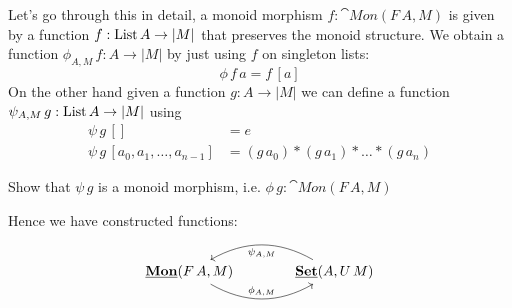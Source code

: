 Let's go through this in detail, a monoid morphism $f:\cat{Mon}(F\,A,M)$ is given by a function $f:\mathrm{List}\,A \to |M|$ that preserves the monoid structure. We obtain a function $\phi_{A,M}\,f : A \to |M|$ by just using $f$ on singleton lists: 
\[\phi\,f\,a = f\,[a]\] 
On the other hand given a function $g : A \to |M|$ we can define a function $\psi_{A,M}\,g : \mathrm{List}\,A \to |M|$ using
\begin{align*}
  \psi\,g\,[] & = e \\
  \psi\,g\, [a_0,a_1,\dots,a_{n-1}] & = (g\,a_0) * (g\,a_1) * \dots * (g\,a_n)
\end{align*}
\begin{Exercise}
  Show that $\psi\,g$ is a monoid morphism, i.e. $\phi\,g : \cat{Mon}(F\,A,M)$
\end{Exercise}
Hence we have constructed functions:
\[\begin{tikzcd}[column sep = large]
\cat{Mon}(F\,A,M) \arrow[r,"\phi_{A,M}",bend right] & \cat{\Set}(A,U\,M) \arrow[l,"\psi_{A,M}",bend right]
\end{tikzcd}\]


